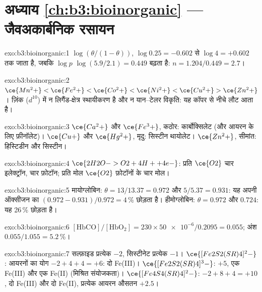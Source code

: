 \section*{अध्याय \ref{ch:b3:bioinorganic} --- जैवअकार्बनिक रसायन}

\begin{solution}{exo:b3:bioinorganic:1}
$\log(\theta/(1 - \theta))$, $\log 0.25 = -0.602$ से $\log 4 = +0.602$ तक जाता है, जबकि $\log p$
$\log(5.9/2.1) = 0.449$ बढ़ता है: $n = 1.204/0.449 = 2.7$।
\end{solution}

\begin{solution}{exo:b3:bioinorganic:2}
$\ce{Mn^2+} < \ce{Fe^2+} < \ce{Co^2+} < \ce{Ni^2+} < \ce{Cu^2+} > \ce{Zn^2+}$। ज़िंक ($d^{10}$) में न लिगैंड-क्षेत्र स्थायीकरण है और न
यान--टेलर विकृति: यह कॉपर से नीचे लौट आता है।
\end{solution}

\begin{solution}{exo:b3:bioinorganic:3}
$\ce{Ca^2+}$ और $\ce{Fe^3+}$, कठोर: कार्बोक्सिलेट (और आयरन के लिए फ़ीनॉलेट)। $\ce{Cu+}$ और $\ce{Hg^2+}$, मृदु:
सिस्टीन थायोलेट। $\ce{Zn^2+}$, सीमांत: हिस्टिडीन और सिस्टीन।
\end{solution}

\begin{solution}{exo:b3:bioinorganic:4}
$\ce{2H2O -> O2 + 4H+ + 4e-}$: प्रति $\ce{O2}$ चार इलेक्ट्रॉन, चार फ़ोटॉन; प्रति मोल $\ce{O2}$
फ़ोटॉनों के चार मोल।
\end{solution}

\begin{solution}{exo:b3:bioinorganic:5}
मायोग्लोबिन: $\theta = 13/13.37 = 0.972$ और $5/5.37 = 0.931$: यह अपनी ऑक्सीजन का $(0.972 - 0.931)/0.972 = 4$\,\%
छोड़ता है। हीमोग्लोबिन: $\theta = 0.972$ और $0.724$: यह 26\,\% छोड़ता है।
\end{solution}

\begin{solution}{exo:b3:bioinorganic:6}
$[\mathrm{HbCO}]/[\mathrm{HbO_2}] = 230 \times \num{50e-6}/0.2095 = 0.055$; अंश $0.055/1.055 = 5.2$\,\%।
\end{solution}

\begin{solution}{exo:b3:bioinorganic:7}
सल्फ़ाइड प्रत्येक $-2$, सिस्टीनेट प्रत्येक $-1$। $\ce{[Fe2S2(SR)4]^2-}$: आयरनों का योग $-2 + 4 + 4 = +6$: दो
Fe(III)। $\ce{[Fe2S2(SR)4]^3-}$: $+5$, एक Fe(III) और एक Fe(II) (मिश्रित संयोजकता)। $\ce{[Fe4S4(SR)4]^2-}$:
$-2 + 8 + 4 = +10$, दो Fe(III) और दो Fe(II), प्रत्येक आयरन औसतन $+2.5$।
\end{solution}

